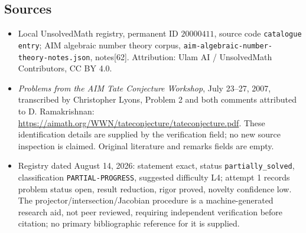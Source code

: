 \documentclass[11pt]{article}
\begin{document}
\subsection{Sources}
\begin{itemize}
\item Local UnsolvedMath registry, permanent ID \(20000411\), source code \texttt{catalogue entry}; AIM algebraic number theory corpus, \texttt{aim-algebraic-number-theory-notes.json}, notes[62]. Attribution: Ulam AI / UnsolvedMath Contributors, CC BY 4.0.
\item \emph{Problems from the AIM Tate Conjecture Workshop}, July 23--27, 2007, transcribed by Christopher Lyons, Problem 2 and both comments attributed to D. Ramakrishnan: \url{https://aimath.org/WWN/tateconjecture/tateconjecture.pdf}. These identification details are supplied by the verification field; no new source inspection is claimed. Original literature and remarks fields are empty.
\item Registry dated August 14, 2026: statement exact, status \texttt{partially\_solved}, classification \texttt{PARTIAL-PROGRESS}, suggested difficulty L4; attempt 1 records problem status open, result reduction, rigor proved, novelty confidence low. The projector/intersection/Jacobian procedure is a machine-generated research aid, not peer reviewed, requiring independent verification before citation; no primary bibliographic reference for it is supplied.
\end{itemize}
\end{document}
